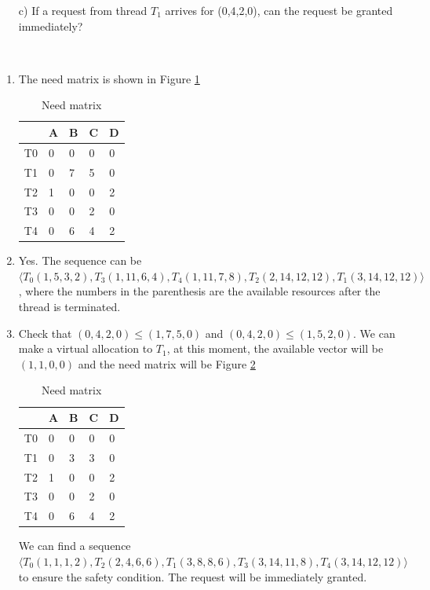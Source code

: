 \begin{exercise}[]
{\begin{enumerate}
    \item [c)]
    If a request from thread $T_1$ arrives for (0,4,2,0), can the request be
    granted immediately?
    \end{enumerate}
    }
  \begin{solution}
  \par{~}
  \begin{enumerate}
      \item The need matrix is shown in Figure \ref{1-1}
       \begin{table}[h]
         \centering
        \begin{tabular}{lllll}
        \hline
           & A & B & C & D \\ \hline
        T0 & 0 & 0 & 0 & 0 \\
        T1 & 0 & 7 & 5 & 0 \\
        T2 & 1 & 0 & 0 & 2 \\
        T3 & 0 & 0 & 2 & 0 \\
        T4 & 0 & 6 & 4 & 2 \\ \hline
        \end{tabular}
        \caption{Need matrix \label{1-1}}
        \end{table}
      \item Yes. The sequence can be $\langle T_0 (1,5,3,2), T_3 (1,11,6,4),T_4 (1,11,7,8),T_2(2,14,12,12),T_1(3,14,12,12)\rangle$, where the numbers in the parenthesis are the available resources after the thread is terminated.
      \item Check that $(0,4,2,0)\le(1,7,5,0)$ and $(0,4,2,0)\le(1,5,2,0)$. We can make a virtual allocation to $T_1$, at this moment, the available vector will be $(1,1,0,0)$ and the need matrix will be Figure \ref{1-2}
      \begin{table}[htbp]
        \centering
        \begin{tabular}{lllll}
        \hline
           & A & B & C & D \\ \hline
        T0 & 0 & 0 & 0 & 0 \\
        T1 & 0 & 3 & 3 & 0 \\
        T2 & 1 & 0 & 0 & 2 \\
        T3 & 0 & 0 & 2 & 0 \\
        T4 & 0 & 6 & 4 & 2 \\ \hline
        \end{tabular}
        \caption{Need matrix \label{1-2}}
        \end{table}
        We can find a sequence $\langle T_0 (1,1,1,2), T_2 (2,4,6,6),T_1 (3,8,8,6),T_3(3,14,11,8),T_4(3,14,12,12)\rangle$ to ensure the safety condition. The request will be immediately granted.
    
  \end{enumerate}
  \end{solution}
  \label{ex1}
\end{exercise}


